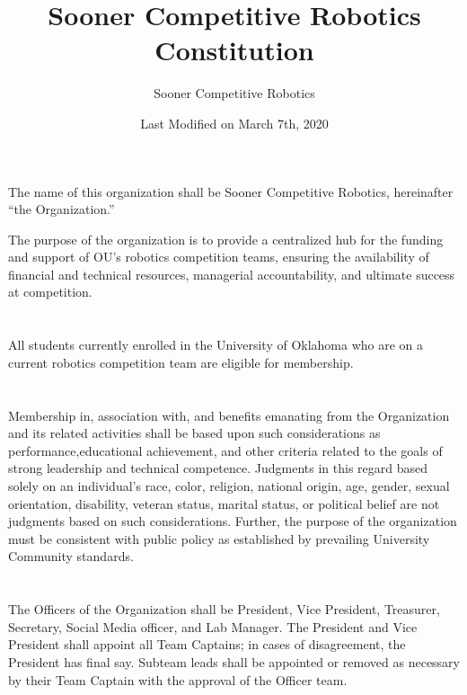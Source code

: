 \documentclass[12pt]{cls/constitution}
\begin{document}
\title{Sooner Competitive Robotics Constitution}
\author{Sooner Competitive Robotics}
\date{Last Modified on March 7th, 2020}
\maketitle
\setcounter{tocdepth}{0}
\tableofcontents
\newpage


The name of this organization shall be Sooner Competitive Robotics,  hereinafter “the Organization.”


The purpose of the organization is to provide a centralized hub for the funding and support of OU's robotics competition teams, ensuring the availability of financial and technical resources, managerial accountability, and ultimate success at competition. 


\section{}
All students currently enrolled in the University of Oklahoma who are on a current robotics competition team are eligible for membership. 

\section{}
Membership in, association with, and benefits emanating from the Organization and its related activities shall be based upon such considerations as performance,educational achievement, and other criteria related to the goals of strong leadership and technical competence. Judgments in this regard based solely on an individual’s race, color, religion, national origin, age, gender, sexual orientation, disability, veteran status, marital status, or political belief are not judgments based on such considerations. Further, the purpose of the organization must be consistent with public policy as established by prevailing University Community standards.  


\section{}
The Officers of the Organization shall be President, Vice President, Treasurer, Secretary, Social Media officer, and Lab Manager.
The President and Vice President shall appoint all Team Captains; in cases of disagreement, the President has final say.
Subteam leads shall be appointed or removed as necessary by their Team Captain with the approval of the Officer team.
\end{document}
